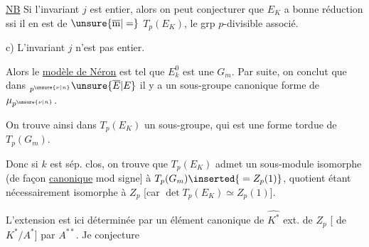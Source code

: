 \uline{NB} Si l'invariant $j$ est entier, alors on peut conjecturer que  $E_K$ a bonne réduction ssi il en est de $\unsure{\overline{\mathrm m}|=}$ $T_p(E_K)$, le grp $p$-divisible associé.

c) L'invariant $j$ n'est pas entier.

Alors le \uline{modèle de \uline{Néron}}  est tel que $E_k^0$ est une  $G_m$. Par suite, on conclut que dans ${}_{p^{\unsure{\nu|n}}}\unsure{\overline E|E}$ il y a un sous-groupe canonique  forme de $\mu_{p^{\unsure{\nu|n}}}$.

On trouve ainsi dans $T_p(E_K)$ un sous-groupe, qui est une forme  tordue de $T_p(G_m)$.

Donc si $k$ est sép. clos, on trouve que $T_p(E_K)$ admet un sous-module isomorphe (de façon \uline{canonique} mod signe] à $T_p(G_m)\inserted{{}=Z_p(1)}$, quotient étant nécessairement isomorphe à $Z_p$ [car $\det T_p(E_K)\simeq Z_p(1)$].

L'extension est ici déterminée par un élément canonique de $\widehat{K^*}$ ext. de $Z_p$ [ de $K^*/A^*$] par $A^{**}$. Je conjecture
